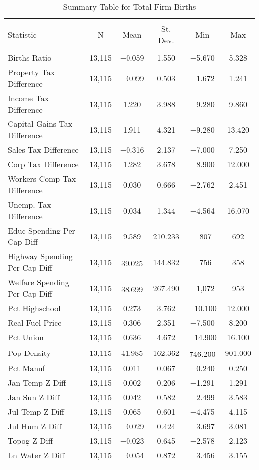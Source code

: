
\begin{table}[!htbp] \centering 
  \caption{Summary Table for  Total Firm Births} 
  \label{--summary} 
\begin{tabular}{@{\extracolsep{5pt}}lccccc} 
\\[-1.8ex]\hline 
\hline \\[-1.8ex] 
Statistic & \multicolumn{1}{c}{N} & \multicolumn{1}{c}{Mean} & \multicolumn{1}{c}{St. Dev.} & \multicolumn{1}{c}{Min} & \multicolumn{1}{c}{Max} \\ 
\hline \\[-1.8ex] 
Births Ratio & 13,115 & $-$0.059 & 1.550 & $-$5.670 & 5.328 \\ 
Property Tax Difference & 13,115 & $-$0.099 & 0.503 & $-$1.672 & 1.241 \\ 
Income Tax Difference & 13,115 & 1.220 & 3.988 & $-$9.280 & 9.860 \\ 
Capital Gains Tax Difference & 13,115 & 1.911 & 4.321 & $-$9.280 & 13.420 \\ 
Sales Tax Difference & 13,115 & $-$0.316 & 2.137 & $-$7.000 & 7.250 \\ 
Corp Tax Difference & 13,115 & 1.282 & 3.678 & $-$8.900 & 12.000 \\ 
Workers Comp Tax Difference & 13,115 & 0.030 & 0.666 & $-$2.762 & 2.451 \\ 
Unemp. Tax Difference & 13,115 & 0.034 & 1.344 & $-$4.564 & 16.070 \\ 
Educ Spending Per Cap Diff & 13,115 & 9.589 & 210.233 & $-$807 & 692 \\ 
Highway Spending Per Cap Diff & 13,115 & $-$39.025 & 144.832 & $-$756 & 358 \\ 
Welfare Spending Per Cap Diff & 13,115 & $-$38.699 & 267.490 & $-$1,072 & 953 \\ 
Pct Highschool & 13,115 & 0.273 & 3.762 & $-$10.100 & 12.000 \\ 
Real Fuel Price & 13,115 & 0.306 & 2.351 & $-$7.500 & 8.200 \\ 
Pct Union & 13,115 & 0.636 & 4.672 & $-$14.900 & 16.100 \\ 
Pop Density & 13,115 & 41.985 & 162.362 & $-$746.200 & 901.000 \\ 
Pct Manuf & 13,115 & 0.011 & 0.067 & $-$0.240 & 0.250 \\ 
Jan Temp Z Diff & 13,115 & 0.002 & 0.206 & $-$1.291 & 1.291 \\ 
Jan Sun Z Diff & 13,115 & 0.042 & 0.582 & $-$2.499 & 3.583 \\ 
Jul Temp Z Diff & 13,115 & 0.065 & 0.601 & $-$4.475 & 4.115 \\ 
Jul Hum Z Diff & 13,115 & $-$0.029 & 0.424 & $-$3.697 & 3.081 \\ 
Topog Z Diff & 13,115 & $-$0.023 & 0.645 & $-$2.578 & 2.123 \\ 
Ln Water Z Diff & 13,115 & $-$0.054 & 0.872 & $-$3.456 & 3.155 \\ 
\hline \\[-1.8ex] 
\end{tabular} 
\end{table} 
